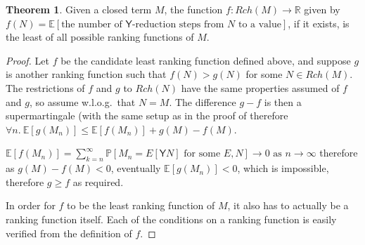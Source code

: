 \documentclass{article}
\newcommand{\tY}{\textsf{Y}}
\theoremstyle{definition}
\theoremstyle{lemma}
\newtheorem{theorem}{Theorem}
\theoremstyle{remark}
\begin{document}
\begin{theorem} \label{thm:minimal}
Given a closed term $M$, the function $f:Rch(M) \to \mathbb R$ given by $f(N) = \mathbb E [\text{the number of }\tY\text{-reduction steps from }N\text{ to a value}]$, if it exists, is the least of all possible ranking functions of $M$.
\end{theorem}
\begin{proof}
Let $f$ be the candidate least ranking function defined above, and suppose $g$ is another ranking function such that $f(N) > g(N)$ for some $N \in Rch(M)$. The restrictions of $f$ and $g$ to $Rch(N)$ have the same properties assumed of $f$ and $g$, so assume w.l.o.g.~that $N=M$. The difference $g - f$ is then a supermartingale (with the same setup as in the proof of 
therefore $\forall n.\ \mathbb E[g(M_n)] \leq \mathbb E[f(M_n)] + g(M)-f(M)$.

$\mathbb E[f(M_n)] = \sum_{k=n}^\infty \mathbb P[M_n = E[\tY N] \text{ for some }E, N] \to 0 \text{ as } n \to \infty$ therefore as $g(M) - f(M) < 0$, eventually $\mathbb E[g(M_n)] < 0$, which is impossible, therefore $g \geq f$ as required.

In order for $f$ to be the least ranking function of $M$, it also has to actually be a ranking function itself. Each of the conditions on a ranking function is easily verified from the definition of $f$.
\end{proof}
\end{document}
